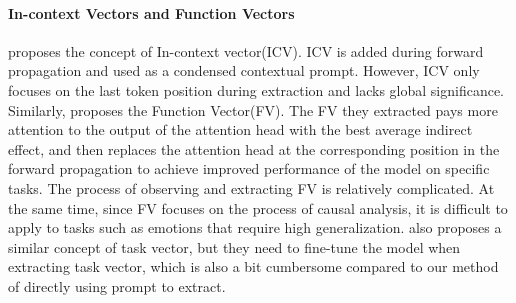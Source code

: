 \paragraph{In-context Vectors and Function Vectors} \citet{liu2024incontextvectorsmakingcontext} proposes the concept of In-context vector(ICV). ICV is added during forward propagation and used as a condensed contextual prompt. 
However, ICV only focuses on the last token position during extraction and lacks global significance. 
Similarly, \citet{todd2024functionvectorslargelanguage} proposes the Function Vector(FV). The FV they extracted pays more attention to the output of the attention head with the best average indirect effect, and then replaces the attention head at the corresponding position in the forward propagation to achieve improved performance of the model on specific tasks. The process of observing and extracting FV is relatively complicated. At the same time, since FV focuses on the process of causal analysis, it is difficult to apply to tasks such as emotions that require high generalization.\citet{ilharco2023editingmodelstaskarithmetic} also proposes a similar concept of task vector, but they need to fine-tune the model when extracting task vector, which is also a bit cumbersome compared to our method of directly using prompt to extract.

